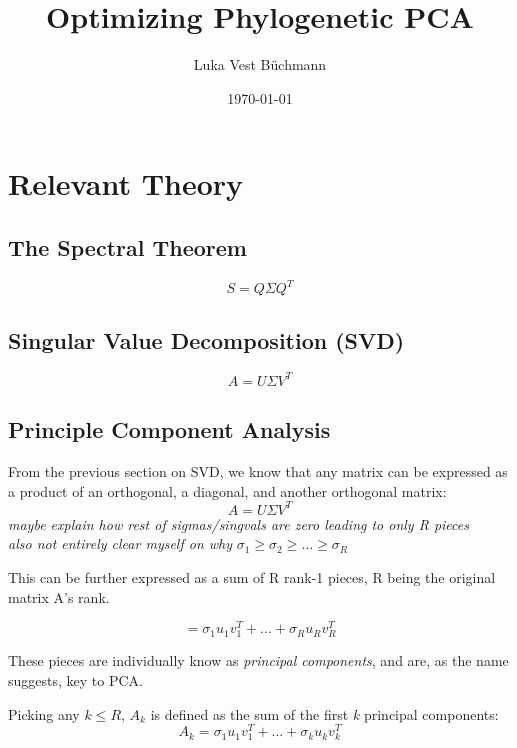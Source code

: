 \documentclass[12pt]{article}
\author{Luka Vest Büchmann}
\title{Optimizing Phylogenetic PCA}
\date{\today}
\theoremstyle{definition}
\begin{document}

\tableofcontents
\newpage

\section{Relevant Theory}


\subsection{The Spectral Theorem}
\begin{equation}
	S = Q \Sigma Q^T
	\label{eq:Spectral}
\end{equation}

\subsection{Singular Value Decomposition (SVD)}



\begin{equation}
	A = U \Sigma V^T
	\label{eq:SVD}
\end{equation}

\subsection{Principle Component Analysis}

From the previous section on SVD, we know that any matrix can be expressed as a product of an orthogonal, a diagonal, and another orthogonal matrix:
$$
A = U \Sigma V^T
$$ 
\textit{maybe explain how rest of sigmas/singvals are zero leading to only R pieces} \\
\textit{also not entirely clear myself on why} $\sigma_1 \ge \sigma_2 \ge \ldots \ge \sigma_R$

This can be further expressed as a sum of R rank-1 pieces, R being the original matrix A's rank.

$$
= \sigma_1 u_1 v_1^T + \ldots + \sigma_R u_R v_R^T
$$ 


These pieces are individually know as \textit{principal components}, and are, as the name suggests, key to PCA. 

Picking any $k \le R$, $A_k$ is defined as the sum of the first \textit{k} principal components: 
$$
A_k = \sigma_1 u_1 v_1^T + \ldots + \sigma_k u_k v_k^T
$$ 
\end{document}
